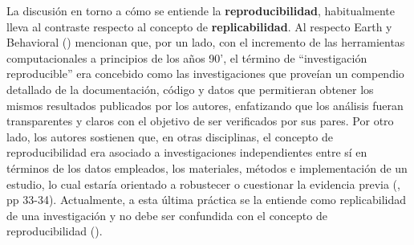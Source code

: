 \documentclass[
  spanish,
  a4paper,
  oneside]{scrbook}
\begin{document}
La discusión en torno a cómo se entiende la \textbf{reproducibilidad},
habitualmente lleva al contraste respecto al concepto de
\textbf{replicabilidad}. Al respecto Earth y Behavioral
() mencionan que, por un
lado, con el incremento de las herramientas computacionales a principios
de los años 90', el término de ``investigación reproducible'' era
concebido como las investigaciones que proveían un compendio detallado
de la documentación, código y datos que permitieran obtener los mismos
resultados publicados por los autores, enfatizando que los análisis
fueran transparentes y claros con el objetivo de ser verificados por sus
pares. Por otro lado, los autores sostienen que, en otras disciplinas,
el concepto de reproducibilidad era asociado a investigaciones
independientes entre sí en términos de los datos empleados, los
materiales, métodos e implementación de un estudio, lo cual estaría
orientado a robustecer o cuestionar la evidencia previa
(, pp
33-34). Actualmente, a esta última práctica se la entiende como
replicabilidad de una investigación y no debe ser confundida con el
concepto de reproducibilidad
().
\end{document}

